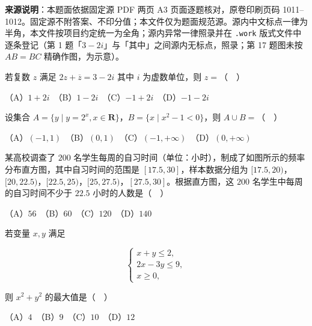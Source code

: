 


\begin{gktip}
\textbf{来源说明}：本题面依据固定源 PDF 两页 A3 页面逐题核对，原卷印刷页码 1011–1012。固定源不附答案、不印分值；本文件仅为题面规范源。源内中文标点一律为半角，本文件按项目约定统一为全角；源内异常一律照录并在 \texttt{.work} 版式文件中逐条登记（第 1 题「\(3-2i\)」与「其中」之间源内无标点，照录；第 17 题图未按 \(AB=BC\) 精确作图，为示意）。
\end{gktip}


\begin{question}
若复数 \(z\) 满足 \(2z+\overline{z}=3-2i\) 其中 \(i\) 为虚数单位，则 \(z=\)（　）

（A）\(1+2i\)　（B）\(1-2i\)　（C）\(-1+2i\)　（D）\(-1-2i\)

\end{question}
\begin{question}
设集合 \(A=\{y\mid y=2^{x},x\in\mathbf{R}\}\)，\(B=\{x\mid x^{2}-1<0\}\)，则 \(A\cup B=\)（　）

（A）\((-1,1)\)　（B）\((0,1)\)　（C）\((-1,+\infty)\)　（D）\((0,+\infty)\)

\Needspace{0.4\textheight}
\end{question}
\begin{question}
某高校调查了 \(200\) 名学生每周的自习时间（单位：小时），制成了如图所示的频率分布直方图，其中自习时间的范围是 \([17.5,30]\)，样本数据分组为 \([17.5,20)\)，\([20,22.5)\)，\([22.5,25)\)，\([25,27.5)\)，\([27.5,30]\)。根据直方图，这 \(200\) 名学生中每周的自习时间不少于 \(22.5\) 小时的人数是（　）
\nopagebreak[4]
\begin{center}\end{center}
\nopagebreak[4]
（A）\(56\)　（B）\(60\)　（C）\(120\)　（D）\(140\)

\end{question}
\begin{question}
若变量 \(x,y\) 满足

\nopagebreak[4]
\[
\begin{cases}
x+y\leqslant 2,\\
2x-3y\leqslant 9,\\
x\geqslant 0,
\end{cases}
\]

则 \(x^{2}+y^{2}\) 的最大值是（　）

（A）\(4\)　（B）\(9\)　（C）\(10\)　（D）\(12\)

\Needspace{0.4\textheight}
\end{question}
